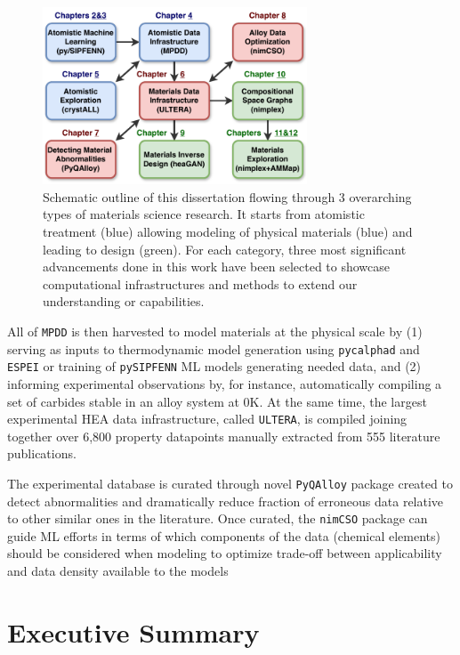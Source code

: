 \begin{figure}[H]
    \centering
    \includegraphics[width=0.7\textwidth]{intro/DissertationOutline.pdf}
    \caption{Schematic outline of this dissertation flowing through 3 overarching types of materials science research. It starts from atomistic treatment (blue) allowing modeling of physical materials (blue) and leading to design (green). For each category, three most significant advancements done in this work have been selected to showcase computational infrastructures and methods to extend our understanding or capabilities.}
    \label{intro:fig:outline}
\end{figure}

All of \texttt{MPDD} is then harvested to model materials at the physical scale by (1) serving as inputs to thermodynamic model generation using \texttt{pycalphad} \cite{Otis2017Pycalphad:Python} and \texttt{ESPEI} \cite{Bocklund2019ESPEICuMg} or training of \texttt{pySIPFENN} ML models generating needed data, and (2) informing experimental observations by, for instance, automatically compiling a set of carbides stable in an alloy system at 0K. At the same time, the largest experimental HEA data infrastructure, called \texttt{ULTERA}, is compiled joining together over 6,800 property datapoints manually extracted from 555 literature publications. 

The experimental database is curated through novel \texttt{PyQAlloy} package created to detect abnormalities and dramatically reduce fraction of erroneous data relative to other similar ones in the literature. Once curated, the \texttt{nimCSO} package can guide ML efforts in terms of which components of the data (chemical elements) should be considered when modeling to optimize trade-off between applicability and data density available to the models




\section{Executive Summary} \label{intro:sec:summary}

